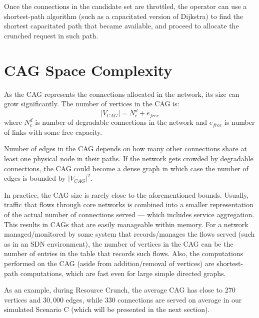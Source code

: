 \documentclass[journal]{IEEEtran}
\begin{document}
Once the connections in the candidate set are throttled, the operator can use a shortest-path algorithm (such as a capacitated version of Dijkstra) to find the shortest capacitated path that became available, and proceed to allocate the crunched request in such path. 

\section{CAG Space Complexity} \label{sec:complexity}

As the CAG represents the connections allocated in the network, its size can grow significantly. The number of vertices in the CAG is:
$$|V_{CAG}| = N_{c}^{d} + e_{free}$$ where $N_{c}^{d}$ is number of degradable connections in the network and $e_{free}$ is number of links with some free capacity.

Number of edges in the CAG depends on how many other connections share at least one physical node in their paths. If the network gets crowded by degradable connections, the CAG could become a dense graph in which case the number of edges is bounded by $|V_{CAG}|^2$.

In practice, the CAG size is rarely close to the aforementioned bounds. Usually, traffic that flows through core networks is combined into a smaller representation of the actual number of connections served --- which includes service aggregation. This results in CAGs that are easily manageable within memory. For a network managed/monitored by some system that records/manages the flows served (such as in an SDN environment), the number of vertices in the CAG can be the number of entries in the table that records such flows. Also, the computations performed on the CAG (aside from addition/removal of vertices) are shortest-path computations, which are fast even for large simple directed graphs.

As an example, during Resource Crunch, the average CAG has close to 270 vertices and $30,000$ edges, while 330 connections are served on average in our simulated Scenario C (which will be presented in the next section).
\end{document}
